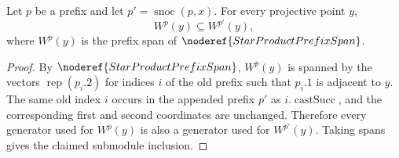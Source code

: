 \begin{lemma}
Let \(p\) be a prefix and let \(p'=\operatorname{snoc}(p,x)\).  For every
projective point \(y\),
\[
  W^p(y)\subseteq W^{p'}(y),
\]
where \(W^p(y)\) is the prefix span of \(\noderef{StarProductPrefixSpan}\).
\end{lemma}
\begin{proof}
By \(\noderef{StarProductPrefixSpan}\), \(W^p(y)\) is spanned by the vectors
\(\operatorname{rep}(p_i.2)\) for indices \(i\) of the old prefix such that
\(p_i.1\) is adjacent to \(y\).  The same old index \(i\) occurs in the
appended prefix \(p'\) as \(i.\operatorname{castSucc}\), and the corresponding
first and second coordinates are unchanged.  Therefore every generator used
for \(W^p(y)\) is also a generator used for \(W^{p'}(y)\).  Taking spans gives
the claimed submodule inclusion.
\end{proof}
